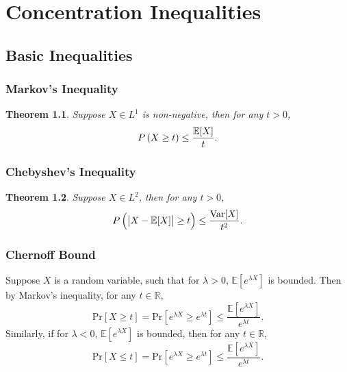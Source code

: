 \documentclass[openany]{book}
\newtheorem{theorem}{Theorem}[chapter]
\theoremstyle{definition}
\theoremstyle{remark}
\begin{document}
\begin{comment}
\section{Hitting Times and Absorption Probability}
Let $(X_t)_{t\ge0}$ be $\mathrm{Markov}(\lambda,P)$. The \textbf{hitting time} of $A\subset I$ is a random variable $H^A:\Omega\to\{0,1,\ldots\}\cup\{\infty\}$ given by
\begin{equation}
    H^A(\omega)=\inf\{t\ge0|X_t(\omega)\in A\}.
\end{equation}
\end{comment}

\part{Concentration Inequalities}
\chapter{Basic Inequalities}
\section{Markov's Inequality}
\begin{theorem}
    Suppose $X\in L^1$ is non-negative, then for any $t>0$,
    \begin{equation*}
        P\del{X\ge t}\le \frac{\mathbb{E}[X]}{t}.
    \end{equation*}
\end{theorem}

\section{Chebyshev's Inequality}
\begin{theorem}
    Suppose $X\in L^2$, then for any $t>0$,
    \begin{equation*}
        P\del{\left|X-\mathbb{E}[X]\right|\ge t}\le \frac{\mathrm{Var}[X]}{t^2}.
    \end{equation*}
\end{theorem}

\section{Chernoff Bound}\label{sec:Chernoff}
Suppose $X$ is a random variable, such that for $\lambda>0$, $\mathbb{E}\left[e^{\lambda X}\right]$ is bounded. Then by Markov's inequality, for any $t\in \mathbb{R}$,
\begin{equation}\label{eq:MarkovCherPos}
    \mathrm{Pr}[X\ge t]=\mathrm{Pr}\left[e^{\lambda X}\ge e^{\lambda t}\right]\le \frac{\mathbb{E}\left[e^{\lambda X}\right]}{e^{\lambda t}}.
\end{equation}
Similarly, if for $\lambda<0$, $\mathbb{E}[e^{\lambda X}]$ is bounded, then for any $t\in \mathbb{R}$,
\begin{equation}\label{eq:MarkovCherNeg}
    \mathrm{Pr}[X\le t]=\mathrm{Pr}\left[e^{\lambda X}\ge e^{\lambda t}\right]\le \frac{\mathbb{E}\left[e^{\lambda X}\right]}{e^{\lambda t}}.
\end{equation}
\end{document}
